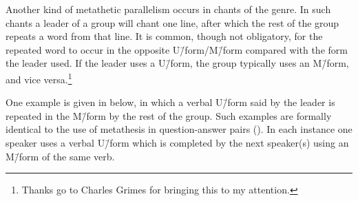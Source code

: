 \begin{exe}
	\label{ex:130825-3, 1.21 ch:ConCon}
		\label{ex:MsimoMaMtoup}
\end{exe}

Another kind of metathetic parallelism occurs in chants of the  genre.
In such chants a leader of a group will chant one line,
after which the rest of the group repeats a word from that line.
It is common, though not obligatory, for the repeated word 
to occur in the opposite U\=/form/M\=/form compared with the form the leader used.
If the leader uses a U\=/form, the group typically uses an M\=/form, and vice versa.\footnote{
	Thanks go to Charles Grimes for bringing this to my attention.}

One example is given in  below,
in which a verbal U\=/form said by the leader
is repeated in the M\=/form by the rest of the group.
Such examples are formally identical to the use of metathesis
in question-answer pairs ().
In each instance one speaker uses a verbal U\=/form which is completed
by the next speaker(s) using an M\=/form of the same verb.

